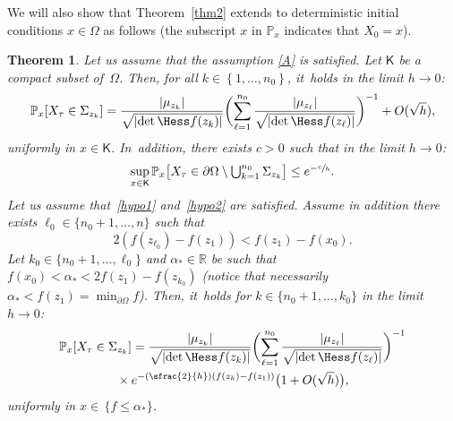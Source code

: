 \documentclass[10pt]{amsart}
\newcommand{\Psfrac}[2]{(\sfrac{#1}{#2})}
\let\ts\textstyle
\theoremstyle{plain}
\newtheorem{theorem}{Theorem}
\theoremstyle{definition}
\begin{document}
We will also show that Theorem~\ref{thm2} extends to deterministic initial conditions $x\in
\Omega$ as follows (the subscript $x$ in $\mathbb P_{x}$ indicates
that $X_0=x$).

\begin{theorem}\label{thm3}
Let us assume that the assumption \ref{A} is satisfied. Let $\mathsf K$ be a compact subset of~$\Omega$. Then, for all $k\in \left\{1,\ldots,n_0\right\}$, it~holds in the limit $h\to 0$:
\begin{equation}\label{eq.px1}
\mathbb P_{x}[X_{\tau}\in \Sigma_{z_k}]= \frac{ \vert \mu_{z_k}\vert }{\sqrt{\vert {\det \Hess f (z_k)} \vert } }
\biggl (\sum_{\ell=1}^{n_0} \frac{ \vert \mu_{z_\ell}\vert }{\sqrt{\vert {\det \Hess f (z_\ell)} \vert } } \biggr)^{-1} + O({\sqrt h}),
\end{equation}
uniformly in $x\in \mathsf K$. In~addition, there exists $c>0$ such that in the limit $h\to 0$:
\begin{equation}\label{eq.px2}
\sup_{x\in \mathsf K}\mathbb P_{x}\bigl[X_{\tau}\in \partial \Omega \setminus\ts\bigcup_{k=1}^{n_0}\Sigma_{z_k}\bigr]\le e^{-\sfrac{c}{h}}.
\end{equation}
Let us assume that~\eqref{hypo1} and~\eqref{hypo2} are satisfied. Assume in addition there exists $\ell_0\in \{n_0+1,\ldots,n\}$ such
that
\begin{equation}\label{eq:hypo2_bis}
2(f(z_{\ell_0})-f(z_1))<f(z_1)-f(x_0).
\end{equation}
Let $k_0\in \{ n_0+1,\ldots,\ell_0\}$ and $ \alpha_* \in \mathbb R$ be such
that $f(x_0) < \alpha_*< 2 f(z_1)-f(z_{k_0})$ (notice that
necessarily $\alpha_*< f(z_1)=\min_{\partial \Omega}f$).
Then, it~holds for $k\in
\{ n_0+1,\ldots,k_0\}$ in the limit $h\to 0$:
\begin{multline}\label{eq.px3}
\mathbb P_{x}[X_{\tau}\in \Sigma_{z_k}]= \frac{ \vert \mu_{z_k}\vert }{\sqrt{\vert {\det \Hess f (z_k)} \vert } }
\biggl (\sum_{\ell=1}^{n_0} \frac{ \vert \mu_{z_\ell}\vert }{\sqrt{
\vert {\det \Hess f (z_\ell)} \vert } } \biggr)^{-1}\\
{}\times
e^{-\Psfrac{2}{h}(f(z_k)-f(z_1))}\bigl(1+ O({\sqrt h}) \bigr),
\end{multline}
uniformly in $x \in \, {\{ f\le \alpha_*\}}$.
\end{theorem}
\end{document}
